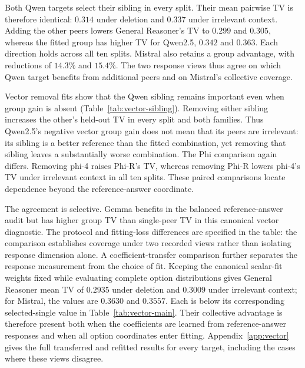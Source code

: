 Both Qwen targets select their sibling in every split. Their mean pairwise TV is therefore identical: $0.314$ under deletion and $0.337$ under irrelevant context. Adding the other peers lowers General Reasoner's TV to $0.299$ and $0.305$, whereas the fitted group has higher TV for Qwen2.5, $0.342$ and $0.363$. Each direction holds across all ten splits. Mistral also retains a group advantage, with reductions of $14.3\%$ and $15.4\%$. The two response views thus agree on which Qwen target benefits from additional peers and on Mistral's collective coverage.



Vector removal fits show that the Qwen sibling remains important even when group gain is absent (Table~\ref{tab:vector-sibling}). Removing either sibling increases the other's held-out TV in every split and both families. Thus Qwen2.5's negative vector group gain does not mean that its peers are irrelevant: its sibling is a better reference than the fitted combination, yet removing that sibling leaves a substantially worse combination. The Phi comparison again differs. Removing phi-4 raises Phi-R's TV, whereas removing Phi-R lowers phi-4's TV under irrelevant context in all ten splits. These paired comparisons locate dependence beyond the reference-answer coordinate.



The agreement is selective. Gemma benefits in the balanced reference-answer audit but has higher group TV than single-peer TV in this canonical vector diagnostic. The protocol and fitting-loss differences are specified in the table: the comparison establishes coverage under two recorded views rather than isolating response dimension alone. A coefficient-transfer comparison further separates the response measurement from the choice of fit. Keeping the canonical scalar-fit weights fixed while evaluating complete option distributions gives General Reasoner mean TV of $0.2935$ under deletion and $0.3009$ under irrelevant context; for Mistral, the values are $0.3630$ and $0.3557$. Each is below its corresponding selected-single value in Table~\ref{tab:vector-main}. Their collective advantage is therefore present both when the coefficients are learned from reference-answer responses and when all option coordinates enter fitting. Appendix~\ref{app:vector} gives the full transferred and refitted results for every target, including the cases where these views disagree.
